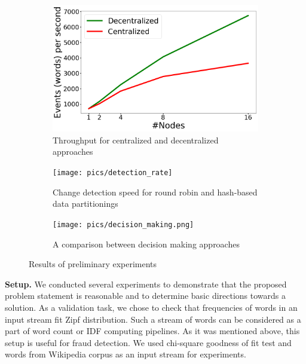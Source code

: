 \label {fs-short-experiments}

\begin{figure}[t!]
    \begin{subfigure}[b]{0.31\textwidth}
            \includegraphics[width=\linewidth]{pics/throughput}
            \caption{Throughput for centralized and decentralized approaches}
            \label{throughput}
    \end{subfigure}%
    \hspace{5mm}
    \begin{subfigure}[b]{0.31\textwidth}
            \texttt{[image: pics/detection\_rate]}
            \caption{Change detection speed for round robin and hash-based data partitionings}
            \label{detection_rate}
    \end{subfigure}%
    \hspace{5mm}
    \begin{subfigure}[b]{0.31\textwidth}
            \texttt{[image: pics/decision\_making.png]}
            \caption{A comparison between decision making approaches}
            \label{decision_making}
    \end{subfigure}%
    \caption{Results of preliminary experiments}
\end{figure}


\indent

{\bf Setup.} We conducted several experiments to demonstrate that the proposed problem statement is reasonable and to determine basic directions towards a solution. As a validation task, we chose to check that frequencies of words in an input stream fit Zipf distribution. Such a stream of words can be considered as a part of word count or IDF computing pipelines. As it was mentioned above, this setup is useful for fraud detection. We used chi-square goodness of fit test and words from Wikipedia corpus as an input stream for experiments.

